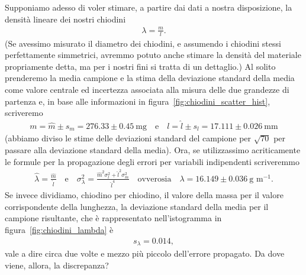 Supponiamo adesso di voler stimare, a partire dai dati a nostra disposizione,
la densità lineare dei nostri chiodini
\begin{align*}
  \lambda = \frac{m}{l}.
\end{align*}
(Se avessimo misurato il diametro dei chiodini, e assumendo i chiodini stessi
perfettamente simmetrici, avremmo potuto anche stimare la densità del
materiale propriamente detta, ma per i nostri fini si tratta di un dettaglio.)
Al solito prenderemo la media campione e la stima della deviazione
standard della media come valore centrale ed incertezza associata alla misura
delle due grandezze di partenza e, in base alle informazioni in
figura~\ref{fig:chiodini_scatter_hist}, scriveremo
\begin{align*}
  m = \hat{m} \pm s_m = 276.33 \pm 0.45~\text{mg} \quad \text{e} \quad
  l = \hat{l} \pm s_l = 17.111 \pm 0.026~\text{mm}
\end{align*}
(abbiamo diviso le stime delle deviazioni standard del campione per
$\sqrt{70}$ per passare alla deviazione standard della media). Ora, se
utilizzassimo acriticamente le formule per la propagazione degli errori per
variabili indipendenti scriveremmo
\begin{align*}
  \hat\lambda = \frac{\hat{m}}{\hat{l}}
  \quad \text{e} \quad
  \sigma^2_\lambda = \frac{\hat{m}^2\sigma_l^2 + \hat{l}^2\sigma_m^2}{\hat{l}^4}
  \quad \text{ovverosia} \quad
  \lambda = 16.149 \pm 0.036~\text{g~m}^{-1}.
\end{align*}
Se invece dividiamo, chiodino per chiodino, il valore della massa per il
valore corrispondente della lunghezza, la deviazione standard della media
per il campione risultante, che è rappresentato nell'istogramma in
figura~\ref{fig:chiodini_lambda} è
\begin{align*}
  s_\lambda = 0.014,
\end{align*}
vale a dire circa due volte e mezzo più piccolo dell'errore propagato. Da
dove viene, allora, la discrepanza?


